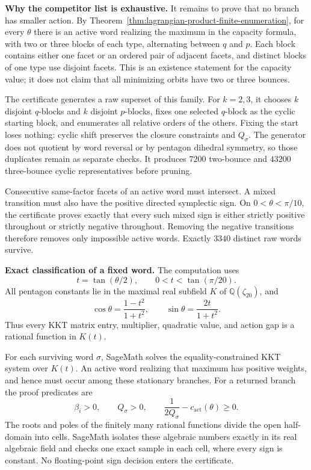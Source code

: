 \par\medskip\noindent\textbf{Why the competitor list is exhaustive.}
It remains to prove that no branch has smaller action.  By
Theorem~\ref{thm:lagrangian-product-finite-enumeration}, for every \(\theta\)
there is an active word realizing the maximum in the capacity formula, with
two or three blocks of each type, alternating between \(q\) and \(p\).  Each
block contains either one facet or an ordered pair of adjacent facets, and
distinct blocks of one type use disjoint facets.  This is an existence
statement for the capacity value; it does not claim that all minimizing orbits
have two or three bounces.

The certificate generates a raw superset of this family.  For \(k=2,3\), it
chooses \(k\) disjoint \(q\)-blocks and \(k\) disjoint \(p\)-blocks, fixes one
selected \(q\)-block as the cyclic starting block, and enumerates all relative
orders of the others.  Fixing the start loses nothing: cyclic shift preserves
the closure constraints and \(Q_\sigma\).  The generator does not quotient by
word reversal or by pentagon dihedral symmetry, so those duplicates remain as
separate checks.  It produces \(7200\) two-bounce and \(43200\) three-bounce
cyclic representatives before pruning.

Consecutive same-factor facets of an active word must intersect.  A mixed
transition must also have the positive directed symplectic sign.  On
\(0<\theta<\pi/10\), the certificate proves exactly that every such mixed sign
is either strictly positive throughout or strictly negative throughout.
Removing the negative transitions therefore removes only impossible active
words.  Exactly \(3340\) distinct raw words survive.

\par\medskip\noindent\textbf{Exact classification of a fixed word.}
The computation uses
\[
  t=\tan(\theta/2),\qquad 0<t<\tan(\pi/20).
\]
All pentagon constants lie in the maximal real subfield \(K\) of
\(\mathbb Q(\zeta_{20})\), and
\[
  \cos\theta=\frac{1-t^2}{1+t^2},\qquad
  \sin\theta=\frac{2t}{1+t^2}.
\]
Thus every KKT matrix entry, multiplier, quadratic value, and action gap is a
rational function in \(K(t)\).

For each surviving word \(\sigma\), SageMath solves the equality-constrained
KKT system over \(K(t)\).  An active word realizing that maximum has positive
weights, and hence must occur among these stationary branches.  For a returned
branch the proof predicates are
\[
  \beta_i>0,\qquad Q_\sigma>0,\qquad
  \frac{1}{2Q_\sigma}-c_{\mathrm{act}}(\theta)\ge0.
\]
The roots and poles of the finitely many rational functions divide the open
half-domain into cells.  SageMath isolates these algebraic numbers exactly in
its real algebraic field and checks one exact sample in each cell, where every
sign is constant.  No floating-point sign decision enters the certificate.

